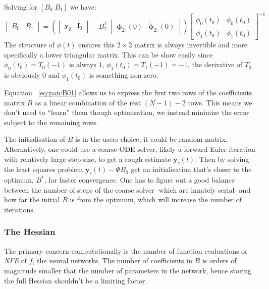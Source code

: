 \documentclass[11pt]{article}
\begin{document}
    Solving for $[B_0 \; B_1]$ we have:
    \begin{equation*}
        \label{eq:pan:B01}
        \begin{bmatrix}
            B_0 & B_1
        \end{bmatrix} = \left(
        \begin{bmatrix}
            \pmb{y}_0 & \pmb{f}_0
        \end{bmatrix}  -
        B^T_{2:} \begin{bmatrix}
                     \pmb\phi_{2:}(0) & \pmb{\dot\phi}_{2:}(0)
        \end{bmatrix}
        \right)
        \begin{bmatrix}
            \phi_0(t_0) & \dot\phi_0(t_0) \\
            \phi_1(t_0) & \dot\phi_1(t_0)
        \end{bmatrix}^{-1}
    \end{equation*}
    The structure of $\phi(t)$ ensures this $2\times 2 $ matrix is always invertible and more specifically
    a lower triangular matrix.
    This can be show easily since $\phi_0(t_0) = T_0(-1)$ is always $1$,  $\phi_1(t_0) = T_1(-1) = -1$, the derivative of
    $T_0$ is obviously $0$ and $\dot\phi_1(t_0)$ is something non-zero.

    Equation ~\eqref{eq:pan:B01} allows us to express the first two rows of the coefficients matrix $B$ as a linear combination
    of the rest $(N-1)-2$ rows.
    This means we don't need to ``learn'' them though optimisation, we instead minimize the error subject to the
    remaining rows.

    The initialisation of $B$ is in the users choice, it could be random matrix.
    Alternatively, one could use a coarse ODE solver, likely a forward Euler iteration with relatively large step size,
    to get a rough estimate $\pmb{y}_c(t)$.
    Then by solving the least squares problem $\pmb{y}_c(t) - \Phi B_0$ get an initialisation that's closer to the
    optimum, $B^*$, for faster convergence.
    One has to figure out a good balance between the number of steps of the coarse solver -which are innately serial-
    and how far the initial $B$ is from the optimum, which will increase the number of iterations.

    \subsubsection{The Hessian}

    The primary concern computationally is the number of function evaluations or \textit{NFE} of $f$,
    the neural networks.
    The number of coefficients in $B$ is orders of magnitude smaller that the number of parameters in the network,
    hence storing the full Hessian shouldn't be a limiting factor.
\end{document}

